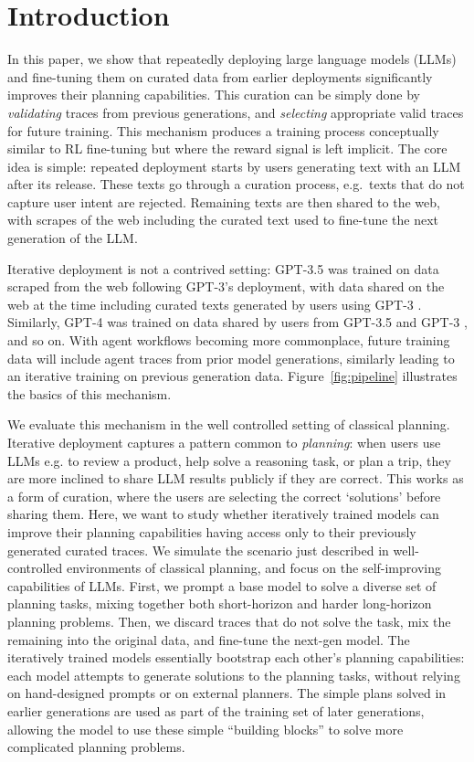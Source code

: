 \section{Introduction}

In this paper, we show that repeatedly deploying large language models (LLMs)
and fine-tuning them on curated data from earlier deployments significantly
improves their planning capabilities.  This curation can be simply done by
\emph{validating} traces from previous generations, and \emph{selecting}
appropriate valid traces for future training. This mechanism produces a training
process conceptually similar to RL fine-tuning but where the reward signal is
left implicit.
The core idea is simple:
repeated deployment starts by users generating text with an LLM after its release. These texts go through a curation process, e.g.\ texts that do not capture user intent are rejected. Remaining texts are then shared to the web, with scrapes of the web including the curated text used to fine-tune the next generation of the LLM.

Iterative deployment is not a contrived setting: GPT-3.5 was trained on data
scraped from the web following GPT-3's deployment, with data shared on the web
at the time including curated texts generated by users using GPT-3
\cite{brown-et-al-neurips2020}. Similarly, GPT-4 was trained on data shared by
users from GPT-3.5 and GPT-3 \cite{openai-arxiv2024}, and so on. With agent
workflows becoming more commonplace, future training data will include agent
traces from prior model generations, similarly leading to an iterative training
on previous generation data. Figure~\ref{fig:pipeline} illustrates the
basics of this mechanism.







We evaluate this mechanism in the well controlled setting of classical planning.
Iterative deployment captures a pattern common to \emph{planning}: when users use LLMs e.g. to review a product, help solve a reasoning task, or plan a trip, they are more inclined to share LLM results publicly if they are correct. This works as a form of curation, where the users are selecting the correct `solutions' before sharing them. Here, we want to study whether iteratively trained models can improve their planning capabilities having access only to their previously generated curated traces. We simulate the scenario just described in well-controlled environments of classical planning, and focus on the self-improving capabilities of LLMs.
First, we prompt a base
model to solve a diverse set of planning tasks, mixing together both
short-horizon and harder long-horizon planning problems. Then, we discard traces that do not solve the task, mix the remaining into the original data, and fine-tune the next-gen
model. The iteratively trained models essentially
bootstrap each other's planning capabilities: each model attempts to generate solutions to the planning tasks,
without relying on hand-designed prompts or on external planners.  The simple
plans solved in earlier generations are used as part of the training set of
later generations, allowing the model to use these simple ``building blocks'' to
solve more complicated planning problems.

